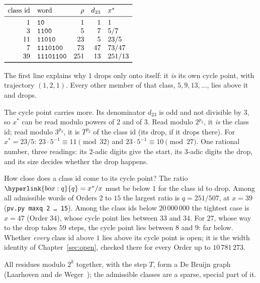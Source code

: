 \documentclass[10pt,a4paper,titlepage]{article}
\makeatletter
\newcommand{\termhere}[1]{\leavevmode
  \Hy@raisedlink{\hyper@anchorstart{term:#1}\hyper@anchorend}}
\newcommand{\keysym}[2]{\hyperlink{box:#1}{#2}}
\newcommand{\pv}[1]{\texttt{pv.py #1}}
\newenvironment{herefloat}[1]
  {\par\addvspace{\intextsep}\noindent\begin{minipage}{\linewidth}%
   \def\@captype{#1}\centering}
  {\end{minipage}\par\nopagebreak\vspace{\intextsep}}
\makeatother
\begin{document}
\nopagebreak
\begin{herefloat}{table}
$\begin{array}{r l r r l}
\toprule
\text{class id} & \text{word} & \rho & d_{23} & x^* \\
\midrule
1 & \bw{10} & 1 & 1 & 1 \\
3 & \bw{1100} & 5 & 7 & 5/7 \\
11 & \bw{11010} & 23 & 5 & 23/5 \\
7 & \bw{1110100} & 73 & 47 & 73/47 \\
39 & \bw{11101100} & 251 & 13 & 251/13 \\
\bottomrule
\end{array}$
\caption{Cycle points $x^* = \rho/d_{23}$ of the first words.}
\label{tab:cycle}
\end{herefloat}

The first line explains why $1$ drops only onto itself: it \emph{is} its own
cycle point, with trajectory $(1, 2, 1)$. Every other member of that class,
$5, 9, 13, \dots$, lies above it and drops.

The cycle point carries more. Its denominator $d_{23}$ is odd and not divisible by
$3$, so $x^*$ can be read modulo powers of $2$ and of $3$. Read modulo $2^{p_2}$,
it \emph{is} the class id; read modulo $3^{p_3}$, it is $T^{p_2}$ of the class id (its drop, if it drops there). For
$x^* = 23/5$: $23 \cdot 5^{-1} \equiv 11 \pmod{32}$ and
$23 \cdot 5^{-1} \equiv 10 \pmod{27}$. One rational number, three readings:
its $2$-adic digits give the start, its $3$-adic digits the drop, and its size
decides whether the drop happens.

\termhere{q}How close does a class id come to its cycle point? The ratio $\keysym{q}{q} = x^*/x$ must
be below $1$ for the class id to drop. Among all admissible words of
Orders $2$ to $15$ the largest ratio is $q = 251/507$, at $x = 39$
(\pv{maxq 2 \dots\ 15}). Among the class ids below $20\,000\,000$ the tightest case is $x = 47$ (Order $34$), whose
cycle point lies between $33$ and $34$. For $27$, whose way to the
drop takes $59$ steps, the cycle point lies between $8$ and $9$: far below.
Whether \emph{every} class id above $1$ lies above its cycle point is open; it is the
width identity of Chapter~\ref{sec:open}, checked there for every Order up to
$10\,781\,273$.

\nopagebreak
All residues modulo $2^k$ together, with the step $T$, form a De Bruijn graph
(Laarhoven and de Weger~\cite{deWeger2012}); the admissible classes are a sparse,
special part of it.
\end{document}
